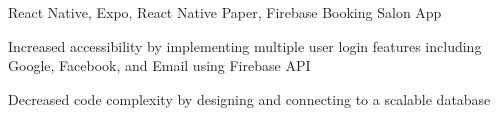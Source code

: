 

\begin{cventries}

  \cventry
    {React Native, Expo, React Native Paper, Firebase} %
    {Booking Salon App} %
    {}
    {}
    {
      \begin{cvitems} %
        \item {Increased accessibility by implementing multiple user login features including Google, Facebook, and Email using Firebase API}
        \item {Decreased code complexity by designing and connecting to a scalable database}
      \end{cvitems}
    }

\end{cventries}

